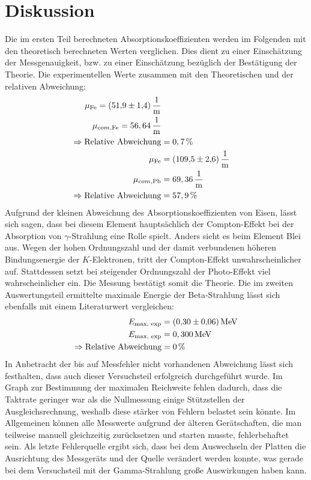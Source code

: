 \section{Diskussion}
\label{sec:Diskussion}

Die im ersten Teil berechneten Absorptionskoeffizienten werden im Folgenden mit den theoretisch berechneten Werten verglichen.
Dies dient zu einer Einschätzung der Messgenauigkeit, bzw. zu einer Einschätzung bezüglich der Bestätigung der Theorie.
Die experimentellen Werte zusammen mit den Theoretischen und der relativen Abweichung:
\begin{align*}
\mu_\text{Fe} = (\num{51.9 +- 1.4})\,\frac{1}{\si{\meter}} \\
\mu_{com, \text{Fe}} = 56,64\,\frac{1}{\si{\meter}} \\
\Rightarrow \text{Relative Abweichung} &= 0,7\,\% \\
\mu_\text{Fe} &= (\num{109.5 +- 2.6})\,\frac{1}{\si{\meter}} \\
\mu_{com, \text{Pb}} &= 69,36\,\frac{1}{\si{\meter}} \\
\Rightarrow \text{Relative Abweichung} &= 57,9\,\%
\end{align*}
Aufgrund der kleinen Abweichung des Absorptionskoeffizienten von Eisen, lässt sich sagen, dass bei diesem Element hauptsächlich
der Compton-Effekt bei der Absorption von $\gamma$-Strahlung eine Rolle spielt. Anders sieht es beim Element Blei aus. Wegen der hohen
Ordnungszahl und der damit verbundenen höheren Bindungsenergie der $K$-Elektronen, tritt der Compton-Effekt unwahrscheinlicher auf. Stattdessen
setzt bei steigender Ordnungszahl der Photo-Effekt viel wahrscheinlicher ein. Die Messung bestätigt somit die Theorie.
Die im zweiten Auswertungsteil ermittelte maximale Energie der Beta-Strahlung lässt sich ebenfalls mit einem Literaturwert \cite[S.20]{kent5} vergleichen:
\begin{align*}
E_\text{max, exp} &= (\num{0.30 +- 0.06})\,\si{\mega\electronvolt} \\
E_\text{max, exp} &= 0,300\,\si{\mega\electronvolt} \\
\Rightarrow \text{Relative Abweichung} &= 0\,\%
\end{align*}
In Anbetracht der bis auf Messfehler nicht vorhandenen Abweichung lässt sich festhalten, dass auch dieser Versuchsteil erfolgreich durchgeführt wurde.
Im Graph zur Bestimmung der maximalen Reichweite fehlen dadurch, dass die Taktrate
geringer war als die Nullmessung einige Stützstellen der Ausgleichsrechnung, weshalb diese
stärker von Fehlern belastet sein könnte.
Im Allgemeinen können alle Messwerte aufgrund der älteren Gerätschaften, die man 
teilweise manuell gleichzeitig zurücksetzen und starten musste, fehlerbehaftet sein.
Als letzte Fehlerquelle ergibt sich, dass bei dem Auswechseln der Platten
die Ausrichtung des Messgeräts und der Quelle verändert werden konnte, was gerade
bei dem Versuchsteil mit der Gamma-Strahlung große Auswirkungen haben kann.